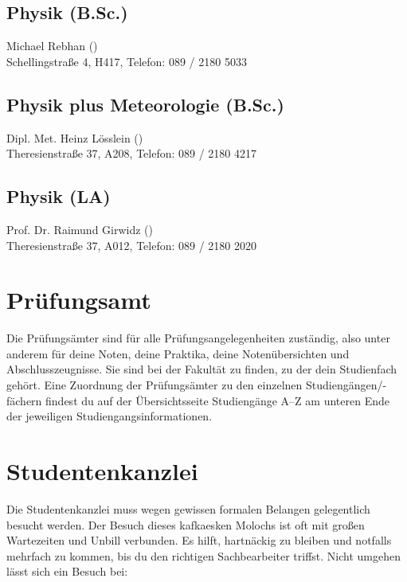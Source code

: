 \subsection*{Physik (B.Sc.)\subjectList{\subjectP}}
Michael Rebhan ()\\
Schellingstraße 4, H417, Telefon: 089 / 2180 \emd{} 5033

\subsection*{Physik plus Meteorologie (B.Sc.)\subjectList{\subjectP}}
Dipl. Met. Heinz Lösslein ()\\
Theresienstraße 37, A208, Telefon: 089 / 2180 \emd{} 4217

\subsection*{Physik (LA)\subjectList{\subjectP}}
Prof. Dr. Raimund Girwidz ()\\
Theresienstraße 37, A012, Telefon: 089 / 2180 \emd{} 2020


\section{Prüfungsamt}
Die Prüfungsämter sind für alle Prüfungsangelegenheiten zuständig,
also unter anderem für deine Noten, deine Praktika, deine Notenübersichten und
Abschlusszeugnisse. Sie sind bei der Fakultät zu finden, zu der
dein Studienfach gehört. Eine Zuordnung der Prüfungsämter zu den
einzelnen Studiengängen/-fächern findest du auf der Übersichtsseite
Studiengänge A--Z am unteren Ende der jeweiligen
Studiengangsinformationen.

\begin{urlList}
\end{urlList}


\section{Studentenkanzlei}

Die Studentenkanzlei muss wegen gewissen formalen Belangen
gelegentlich besucht werden. Der Besuch dieses kafkaesken Molochs ist
oft mit großen Wartezeiten und Unbill verbunden. Es hilft, hartnäckig
zu bleiben und notfalls mehrfach zu kommen, bis du den richtigen
Sachbearbeiter triffst. Nicht umgehen lässt sich ein Besuch bei:

